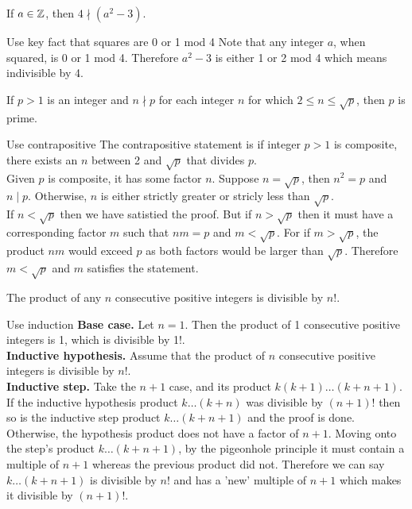 \documentclass{article}
\begin{document}
\begin{problem}
If $a \in \mathbb{Z}$, then $4 \nmid (a^2 - 3)$.
\end{problem}
\begin{solution}{Use key fact that squares are 0 or 1 mod 4}
    Note that any integer $a$, when squared, is 0 or 1 mod 4. Therefore $a^2 - 3$ is either 1 or 2 mod 4 which means indivisible by 4.
\end{solution}

\begin{problem}
If $p > 1$ is an integer and $n \nmid p$ for each integer $n$ for which $2 \leq n \leq \sqrt{p}$, then $p$ is prime.
\end{problem}
\begin{solution}{Use contrapositive}
    The contrapositive statement is if integer $p > 1$ is composite, there exists an $n$ between 2 and $\sqrt{p}$ that divides $p$.
    \\

    Given $p$ is composite, it has some factor $n$. Suppose $n = \sqrt{p}$, then $n^2 = p$ and $n \mid p$. Otherwise, $n$ is either strictly greater or stricly less than $\sqrt{p}$.
    \\

    If $n < \sqrt{p}$ then we have satistied the proof. But if $n > \sqrt{p}$ then it must have a corresponding factor $m$ such that $nm = p$ and $m < \sqrt{p}$. For if $m > \sqrt{p}$, the product $nm$ would exceed $p$ as both factors would be larger than $\sqrt{p}$. Therefore $m < \sqrt{p}$ and $m$ satisfies the statement.
\end{solution}

\begin{problem}
The product of any $n$ consecutive positive integers is divisible by $n!$.
\end{problem}
\begin{solution}{Use induction}
    \textbf{Base case.} Let $n = 1$. Then the product of 1 consecutive positive integers is 1, which is divisible by 1!.
    \\

    \textbf{Inductive hypothesis.} Assume that the product of $n$ consecutive positive integers is divisible by $n!$.
    \\

    \textbf{Inductive step.} Take the $n+1$ case, and its product $k(k+1)\ldots(k+n+1)$. If the inductive hypothesis product $k\ldots(k+n)$ was divisible by $(n+1)!$ then so is the inductive step product $k\ldots(k+n+1)$ and the proof is done. Otherwise, the hypothesis product does not have a factor of $n+1$. Moving onto the step's product $k\ldots(k+n+1)$, by the pigeonhole principle it must contain a multiple of $n+1$ whereas the previous product did not. Therefore we can say $k\ldots(k+n+1)$ is divisible by $n!$ and has a 'new' multiple of $n+1$ which makes it divisible by $(n+1)!$.
\end{solution}
\end{document}

